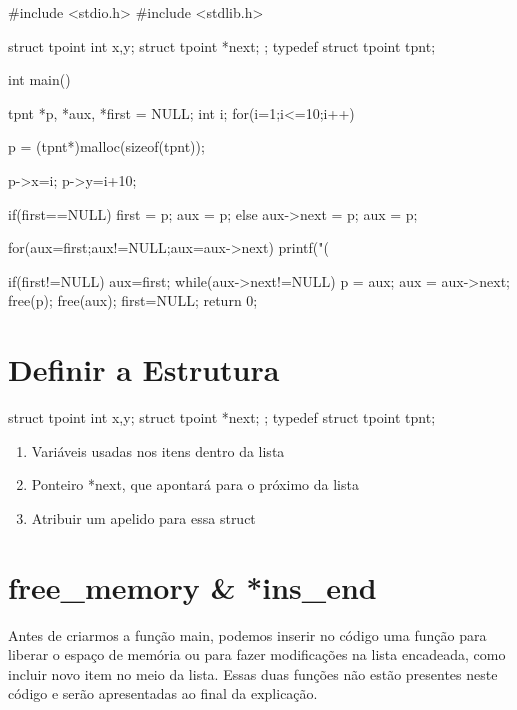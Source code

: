 \documentclass[ ]{article}
\begin{document}
	\begin{mylist}
#include <stdio.h>
#include <stdlib.h>

struct tpoint{
	int x,y;
	struct tpoint *next;
};
typedef struct tpoint tpnt;

int main(){
	tpnt *p, *aux, *first = NULL;
	int i;
	for(i=1;i<=10;i++){
		p = (tpnt*)malloc(sizeof(tpnt));
		
		p->x=i;
		p->y=i+10;
		
		if(first==NULL){
			first = p;
			aux = p;
		}
		else{
			aux->next = p;
			aux = p;
		}
	}
	
	for(aux=first;aux!=NULL;aux=aux->next){
		printf("(%
	}
	
	if(first!=NULL){
		aux=first;
		while(aux->next!=NULL){
			p = aux;
			aux = aux->next;
			free(p);
		}
		free(aux);
		first=NULL;
	}
	return 0;
}
	\end{mylist}
\section{Definir a Estrutura}
\begin{minipage}{8 cm}
	\begin{mylist}
struct tpoint{
	int x,y;
	struct tpoint *next;
};
typedef struct tpoint tpnt;
	\end{mylist}		
\end{minipage}
\begin{minipage}{8 cm}
	\begin{enumerate}
	\item Variáveis usadas nos itens dentro da lista
	\item Ponteiro *next, que apontará para o próximo da lista
	\item Atribuir um apelido para essa struct
	\end{enumerate}
\end{minipage}
\section{free\_memory \& *ins\_end}
	Antes de criarmos a função main, podemos inserir no código uma função para liberar o espaço de memória ou para fazer modificações na lista encadeada, como incluir novo item no meio da lista. Essas duas funções não estão presentes neste código e serão apresentadas ao final da explicação.
\end{document}
